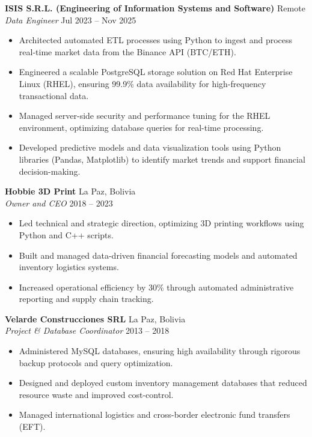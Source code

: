 \documentclass[11pt,a4paper,sans]{article}
\begin{document}
\textbf{ISIS S.R.L. (Engineering of Information Systems and Software)} \hfill Remote \\
\textit{Data Engineer} \hfill Jul 2023 -- Nov 2025
\begin{itemize}
    \item Architected automated ETL processes using Python to ingest and process real-time market data from the Binance API (BTC/ETH).
    \item Engineered a scalable PostgreSQL storage solution on Red Hat Enterprise Linux (RHEL), ensuring 99.9\% data availability for high-frequency transactional data.
    \item Managed server-side security and performance tuning for the RHEL environment, optimizing database queries for real-time processing.
    \item Developed predictive models and data visualization tools using Python libraries (Pandas, Matplotlib) to identify market trends and support financial decision-making.
\end{itemize}

\vspace{6pt}

\textbf{Hobbie 3D Print} \hfill La Paz, Bolivia \\
\textit{Owner and CEO} \hfill 2018 -- 2023
\begin{itemize}
    \item Led technical and strategic direction, optimizing 3D printing workflows using Python and C++ scripts.
    \item Built and managed data-driven financial forecasting models and automated inventory logistics systems.
    \item Increased operational efficiency by 30\% through automated administrative reporting and supply chain tracking.
\end{itemize}

\vspace{6pt}

\textbf{Velarde Construcciones SRL} \hfill La Paz, Bolivia \\
\textit{Project \& Database Coordinator} \hfill 2013 -- 2018
\begin{itemize}
    \item Administered MySQL databases, ensuring high availability through rigorous backup protocols and query optimization.
    \item Designed and deployed custom inventory management databases that reduced resource waste and improved cost-control.
    \item Managed international logistics and cross-border electronic fund transfers (EFT).
\end{itemize}
\end{document}
